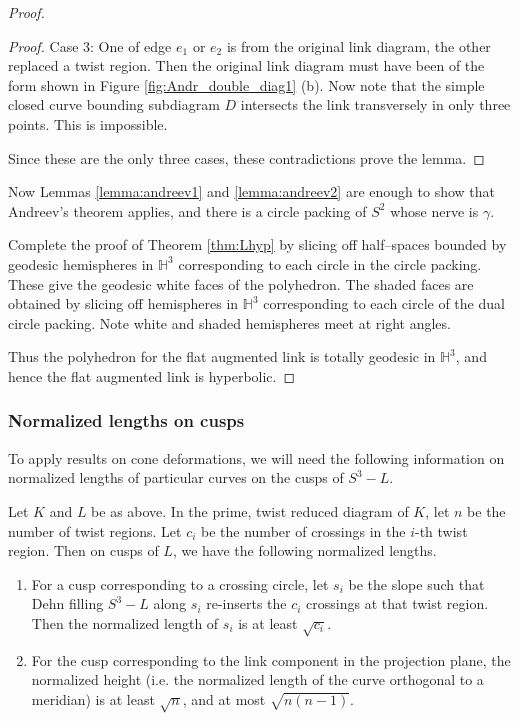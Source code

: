 \begin{proof}
\begin{proof}
Case 3: One of edge $e_1$ or $e_2$ is from the original link diagram,
the other replaced a twist region.  Then the original link diagram
must have been of the form shown in Figure \ref{fig:Andr_double_diag1}
(b).  Now note that the simple closed curve bounding subdiagram $D$
intersects the link transversely in only three points.  This is
impossible.

Since these are the only three cases, these contradictions prove the
lemma. 
\end{proof}


Now Lemmas \ref{lemma:andreev1} and \ref{lemma:andreev2} are enough to
show that Andreev's theorem applies, and there is a circle packing of
$S^2$ whose nerve is $\gamma$.

Complete the proof of Theorem \ref{thm:Lhyp} by slicing off
half--spaces bounded by geodesic hemispheres in $\mathbb H^3$
corresponding to each circle in the circle packing.  These give the
geodesic white faces of the polyhedron.  The shaded faces are obtained
by slicing off hemispheres in $\mathbb H^3$ corresponding to each
circle of the dual circle packing.  Note white and shaded hemispheres
meet at right angles.  

Thus the polyhedron for the flat augmented link is totally geodesic in
$\mathbb H^3$, and hence the flat augmented link is hyperbolic.
\end{proof}



\subsubsection{Normalized lengths on cusps}  To apply results on cone
deformations, we will need the following information on normalized
lengths of particular curves on the cusps of $S^3-L$.


\begin{prop}
  Let $K$ and $L$ be as above.  In the prime, twist reduced diagram of
  $K$, let $n$ be the number of twist regions.  Let $c_i$ be the
  number of crossings in the $i$-th twist region.  Then on
  cusps of $L$, we have the following normalized lengths.
  \begin{enumerate}
  \item For a cusp corresponding to a crossing circle, let $s_i$ be
    the slope such that {D}ehn filling $S^3-L$ along $s_i$ re-inserts
    the $c_i$ crossings at that twist region.  Then the normalized
    length of $s_i$ is at least $\sqrt{c_i}$.
  \item For the cusp corresponding to the link component in the
    projection plane, the normalized height (i.e. the normalized
    length of the curve orthogonal to a meridian) is at least
    $\sqrt{n}$, and at most $\sqrt{n(n-1)}$.
  \end{enumerate}
\label{prop:proj-height}
\end{prop}

